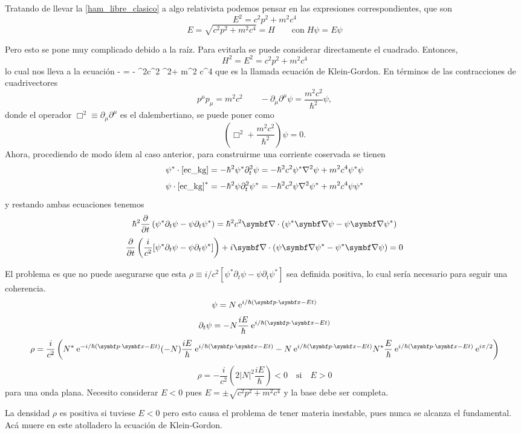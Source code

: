 \documentclass[10pt,oneside]{CBFT_book}
\begin{document}
Tratando de llevar la \eqref{ham_libre_clasico} a algo relativista podemos pensar en las expresiones
correspondientes, que son
\[
	E^2 = c^2 p^2 + m^2 c^4
\]
\[
	E = \sqrt{ c^2 p^2 + m^2 c^4 } = H \qquad \text{con} \; H\psi = E\psi
\]

Pero esto se pone muy complicado debido a la raíz. Para evitarla se puede considerar directamente
el cuadrado.
Entonces,
\[
	H^2 = E^2 = c^2p^2 + m^2c^4
\]
lo cual nos lleva a la ecuación
\be 
	-\hbar {} = - \hbar^2c^2 \Nabla^2\psi + m^2 c^4 \psi
	\label{ec_kg}
\ee
que es la llamada ecuación de Klein-Gordon.
En términos de las contracciones de cuadrivectores 
\[
	p^\mu p_\mu = m^2c^2 \qquad -\partial_\mu\partial^\mu \psi = \frac{m^2c^2}{\hbar^2}\psi,
\]
donde el operador $\Box^2 \equiv \partial_\mu\partial^\mu$ es el dalembertiano, se puede poner
como
\[
	\left( \Box^2 + \frac{m^2c^2}{\hbar^2} \right) \psi = 0.
\]
Ahora, procediendo de modo ídem al caso anterior, para construirme una corriente coservada
se tienen
\[
	\psi^* \cdot \eqref{ec_kg} = - \hbar^2 \psi^* \partial_t^2 \psi =
	- \hbar^2 c^2 \psi^* \nabla^2 \psi + m^2 c^4 \psi^*\psi
\]
\[
	\psi \cdot \eqref{ec_kg}^* = - \hbar^2 \psi \partial_t^2 \psi^* =
	- \hbar^2 c^2 \psi \nabla^2 \psi^* + m^2 c^4 \psi\psi^*
\]
y restando ambas ecuaciones tenemos
\[
	\hbar^2 \dpar{}{t}\left(  \psi^* \partial_t \psi -  \psi \partial_t \psi^* \right) =
	\hbar^2 c^2 \Nabla\cdot( \psi^* \Nabla \psi - \psi \Nabla \psi^* )
\]
\[
	\dpar{}{t}\left( \frac{i}{c^2}[ \psi^* \partial_t \psi -  \psi \partial_t \psi^* ]\right) +
	i\Nabla\cdot( \psi \Nabla \psi^* - \psi^* \Nabla \psi ) = 0
\]

El problema es que no puede asegurarse que esta $\rho \equiv i/c^2[ \psi^* \partial_t \psi -  \psi \partial_t 
\psi^* ]$ sea definida positiva, lo cual sería necesario para seguir una coherencia.
\[
	\psi = N \euler^{ i/\hbar(\pe{p}{x} - Et)}
\]
\[
	\partial_t \psi = -N \frac{iE}{\hbar} \euler^{ i/\hbar(\pe{p}{x} - Et)}
\]
\[
	\rho = \frac{i}{c^2}\left( N^*\euler^{ -i/\hbar(\pe{p}{x} - Et)}(-N)
	\frac{iE}{\hbar} \euler^{ i/\hbar(\pe{p}{x} - Et)} - 
	N \euler^{ i/\hbar(\pe{p}{x} - Et)}N^*\frac{E}{\hbar} \euler^{ i/\hbar(\pe{p}{x} - Et)}\euler^{i\pi/2}
	\right)
\]
\[
	\rho = -\frac{i}{c^2}\left( 2|N|^2 \frac{iE}{\hbar} \right) < 0 \quad \text{si} \quad E > 0
\]
para una onda plana.
Necesito considerar $E<0$ pues $E=\pm\sqrt{c^2p^2+m^2c^4}$ y la base debe ser completa.

La densidad $\rho$ es positiva si tuviese $E<0$ pero esto causa el problema de tener materia inestable, pues nunca se 
alcanza el fundamental. Acá muere en este atolladero la ecuación de Klein-Gordon.
\end{document}
